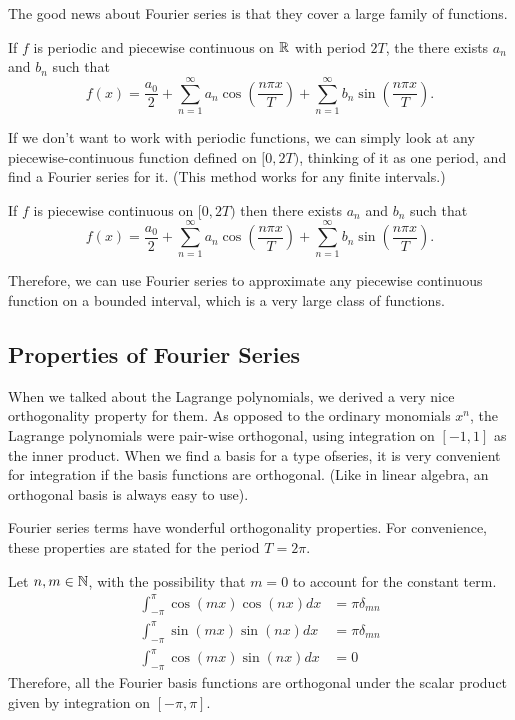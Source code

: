 \documentclass[fleqn,letterpaper]{report}
\begin{document}
The good news about Fourier series is that they cover a large
family of functions. 

\begin{thm}
If $f$ is periodic and piecewise continuous on $\mathbb{R}$ with
period $2T$, the there exists $a_n$ and $b_n$ such that 
\begin{equation*}
f(x) = \frac{a_0}{2} + \sum_{n=1}^\infty a_n \cos \left(
\frac{n\pi x}{T} \right) + \sum_{n=1}^\infty b_n \sin \left(
\frac{n\pi x}{T} \right).
\end{equation*}
\end{thm}

If we don't want to work with periodic functions, we can
simply look at any piecewise-continuous function defined on
$[0,2T)$, thinking of it as one period, and find a Fourier
series for it. (This method works for any finite intervals.)

\begin{thm}
If $f$ is piecewise continuous on $[0,2T)$
then there exists $a_n$ and $b_n$ such that 
\begin{equation*}
f(x) = \frac{a_0}{2} + \sum_{n=1}^\infty a_n \cos \left(
\frac{n\pi x}{T} \right) + \sum_{n=1}^\infty b_n \sin \left(
\frac{n\pi x}{T} \right).
\end{equation*}
\end{thm}

Therefore, we can use Fourier series to approximate any
piecewise continuous function on a bounded interval, which is
a very large class of functions.

\subsection{Properties of Fourier Series}
\label{fourier-properties}

When we talked about the Lagrange polynomials, we derived a
very nice orthogonality property for them. As opposed to the
ordinary monomials $x^n$, the Lagrange polynomials were
pair-wise orthogonal, using integration on $[-1,1]$ as the
inner product. When we find a basis for a type ofseries, it
is very convenient for integration if the basis functions are
orthogonal. (Like in linear algebra, an orthogonal basis is
always easy to use). 

Fourier series terms have wonderful orthogonality properties. For
convenience, these properties are stated for the period $T =
2\pi$. 

\begin{prop}
Let $n, m \in \mathbb{N}$, with the possibility that $m=0$ to
account for the constant term.
\begin{align*}
\int_{-\pi}^{\pi} \cos (mx) \cos (nx) dx & = \pi \delta_{mn} \\
\int_{-\pi}^{\pi} \sin (mx) \sin (nx) dx & = \pi \delta_{mn} \\
\int_{-\pi}^{\pi} \cos (mx) \sin (nx) dx & = 0
\end{align*}
Therefore, all the Fourier basis functions are orthogonal
under the scalar product given by integration on $[-\pi,\pi]$. 
\end{prop}
\end{document}

